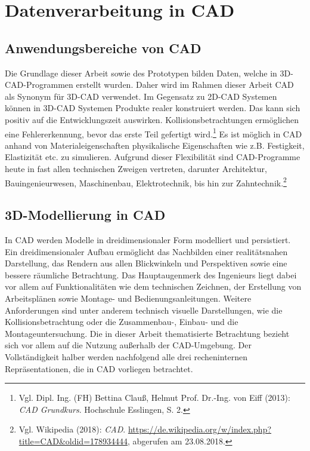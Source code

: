 \chapter{Datenverarbeitung in CAD}
\section{Anwendungsbereiche von CAD}
\label{sec:DatenverarbeitungInCAD}

Die Grundlage dieser Arbeit sowie des Prototypen bilden Daten, welche in 3D-CAD-Programmen erstellt wurden. Daher wird im Rahmen dieser Arbeit CAD als Synonym für 3D-CAD verwendet. Im Gegensatz zu 2D-CAD Systemen können in 3D-CAD Systemen Produkte realer konstruiert werden. Das kann sich positiv auf die Entwicklungszeit auswirken. Kollisionsbetrachtungen ermöglichen eine Fehlererkennung, bevor das erste Teil gefertigt wird.\footnote{Vgl. Dipl. Ing. (FH) Bettina Clauß, Helmut Prof. Dr.-Ing. von Eiff (2013): \textit{CAD Grundkurs}. Hochschule Esslingen, S. 2.} Es ist möglich in CAD anhand von Materialeigenschaften physikalische Eigenschaften wie z.B. Festigkeit, Elastizität etc. zu simulieren. Aufgrund dieser Flexibilität sind CAD-Programme heute in fast allen technischen Zweigen vertreten, darunter Architektur, Bauingenieurwesen, Maschinenbau, Elektrotechnik, bis hin zur Zahntechnik.\footnote{Vgl. Wikipedia  (2018): \textit{CAD}.\newline
\url{https://de.wikipedia.org/w/index.php?title=CAD&oldid=178934444},\newline 
abgerufen am 23.08.2018.}


\section{3D-Modellierung in CAD}
\label{sec:3D-ModellierungInCAD}
In CAD werden Modelle in dreidimensionaler Form modelliert und persistiert. Ein dreidimensionaler Aufbau ermöglicht das Nachbilden einer realitätsnahen Darstellung, das Rendern aus allen Blickwinkeln und Perspektiven sowie eine bessere räumliche Betrachtung. Das Hauptaugenmerk des Ingenieurs liegt dabei vor allem auf Funktionalitäten wie dem technischen Zeichnen, der Erstellung von Arbeitsplänen sowie Montage- und Bedienungsanleitungen. Weitere Anforderungen sind unter anderem technisch visuelle Darstellungen, wie die Kollisionsbetrachtung oder die Zusammenbau-, Einbau- und die Montageuntersuchung.
Die in dieser Arbeit thematisierte Betrachtung bezieht sich vor allem auf die Nutzung außerhalb der CAD-Umgebung.  Der Vollständigkeit halber werden nachfolgend alle drei recheninternen Repräsentationen, die in CAD vorliegen betrachtet.

